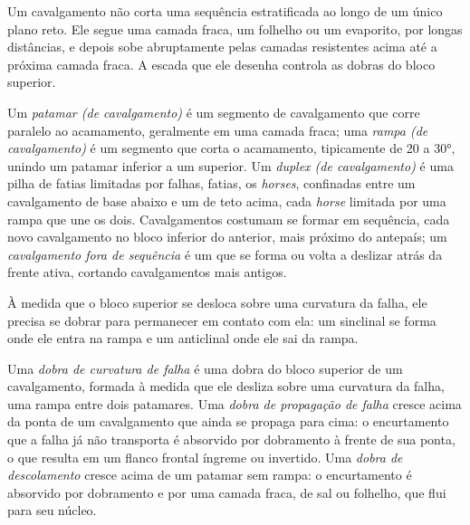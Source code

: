 Um cavalgamento não corta uma sequência estratificada ao longo de um único plano reto.
Ele segue uma camada fraca, um folhelho ou um evaporito, por longas distâncias, e depois
sobe abruptamente pelas camadas resistentes acima até a próxima camada fraca. A
escada que ele desenha controla as dobras do bloco superior.

\begin{definition}\label{def:b3:orogenic-wedges:thrust-geometry}
Um \emph{patamar (de cavalgamento)} é um segmento de cavalgamento que corre
paralelo ao acamamento, geralmente em uma camada fraca; uma \emph{rampa
(de cavalgamento)} é um segmento que corta o acamamento,
tipicamente de 20 a \ang{30}, unindo um patamar inferior a um superior. Um
\emph{duplex (de cavalgamento)} é uma pilha de fatias limitadas por falhas,
fatias, os \textit{horses}, confinadas entre um cavalgamento de base abaixo e um de teto
acima, cada \textit{horse} limitada por uma rampa que une os dois. Cavalgamentos costumam se formar
em sequência, cada novo cavalgamento no bloco inferior do anterior, mais próximo do
antepaís; um \emph{cavalgamento fora de sequência} é
um que se forma ou volta a deslizar atrás da frente ativa, cortando cavalgamentos mais antigos.
\end{definition}

À medida que o bloco superior se desloca sobre uma curvatura da falha, ele precisa se dobrar para permanecer em
contato com ela: um sinclinal se forma onde ele entra na rampa e um anticlinal
onde ele sai da rampa.

\begin{definition}\label{def:b3:orogenic-wedges:thrust-folds}
Uma \emph{dobra de curvatura de falha} é uma dobra do bloco superior
de um cavalgamento, formada à medida que ele desliza sobre uma curvatura da falha, uma rampa entre
dois patamares. Uma \emph{dobra de propagação de falha}
cresce acima da ponta de um cavalgamento que ainda se propaga para cima: o
encurtamento que a falha já não transporta é absorvido por dobramento à frente
de sua ponta, o que resulta em um flanco frontal íngreme ou invertido. Uma \emph{dobra de
descolamento} cresce acima de um patamar sem rampa: o encurtamento
é absorvido por dobramento e por uma camada fraca, de sal ou folhelho, que flui para
seu núcleo.
\end{definition}

